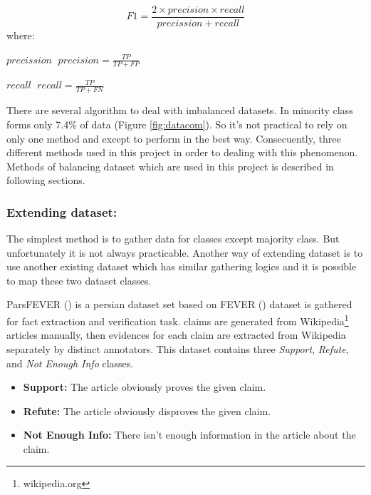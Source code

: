 \begin{equation}
	\label{eq:f1}
	 F1 = \frac{2 \times precision \times recall }{precission + recall}
\end{equation}
where: 
\begin{eqexpl}[25mm]
	\item{$precission$} $\; precision = \frac{TP}{TP + FP} \;$
	\item{$recall$} $\; recall = \frac{TP}{TP + FN} \;$ 
\end{eqexpl}

\bigbreak
There are several algorithm to deal with imbalanced datasets. In \cite{stance_persian} minority class forms only 7.4\% of data (Figure \ref{fig:datacom}). So it's not practical to rely on only one method and except to perform in the best way. Consecuently, three different methods used in this project in order to dealing with this phenomenon. Methods of balancing dataset which are used in this project is described in following sections.  
	
\subsubsection{\textbf{Extending dataset:}}
The simplest method is to gather data for classes except majority class. But unfortunately it is not always practicable. Another way of extending dataset is to use another existing dataset which has similar gathering logics and it is possible to map these two dataset classes. 

ParsFEVER (\cite{parsfever}) is a persian dataset set based on FEVER (\cite{fever}) dataset is gathered for fact extraction and verification task. \cite{parsfever} claims are generated from Wikipedia\footnote{wikipedia.org} articles manually, then evidences for each claim are extracted from Wikipedia separately by distinct annotators. This dataset contains three \textit{Support}, \textit{Refute}, and \textit{Not Enough Info} classes. 
\begin{itemize}
	\item {\color{green!70!black}\textbf{Support:}} The article obviously proves the given claim. 
	\item {\color{red!60!black}\textbf{Refute:}} The article obviously disproves the given claim.
	\item {\color{gray}\textbf{Not Enough Info:}} There isn't enough information in the article about the claim. 
\end{itemize}                

